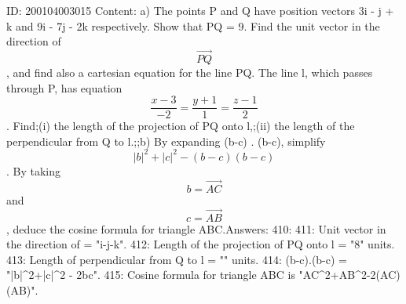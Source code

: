 \documentclass{article}
\begin{document}
ID: 200104003015
Content:
a)  The points P and Q have position vectors 3i - j + k and 9i - 7j - 2k respectively. Show that PQ = 9. Find the unit vector in the direction of  $$\vec{PQ}$$, and find also a cartesian equation for the line PQ. The line l, which passes through P, has equation  $$\frac{x - 3}{- 2} = \frac{y + 1}{1} = \frac{z - 1}{2}$$. Find;(i) the length of the projection of PQ onto l,;(ii) the length of the perpendicular from Q to l.;;b) By expanding (b-c) . (b-c), simplify  $$| b |^2  + | c |^2  -  (b-c)( b-c)$$. By taking  $$b = \vec{AC}$$ and  $$c = \vec{AB}$$, deduce the cosine formula for triangle ABC.Answers:
410: 
411: Unit vector in the direction of  = "i-j-k".
412: Length of the projection of PQ onto l = "8" units.
413:  Length of perpendicular from Q to l = "" units.
414: (b-c).(b-c) = "|b|^2+|c|^2 - 2bc".
415: Cosine formula for triangle ABC is "AC^2+AB^2-2(AC)(AB)".
\end{document}
